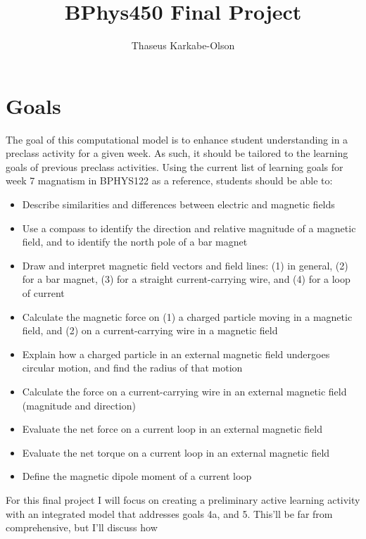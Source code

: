 \documentclass[11pt]{article}
\title{BPhys450 Final Project}
\author{Thaseus Karkabe-Olson}
\date{}
\begin{document}
	\maketitle

    \raggedright

    \section*{Goals}

        The goal of this computational model is to enhance student understanding in a preclass activity for a given week. As such, it should be tailored to the learning goals of previous preclass activities. Using the current list of learning goals for week 7 magnatism in BPHYS122 as a reference, students should be able to:

        \begin{itemize}

            \item Describe similarities and differences between electric and magnetic fields
            \item Use a compass to identify the direction and relative magnitude of a magnetic field, and to identify the north pole of a bar magnet
            \item Draw and interpret magnetic field vectors and field lines: (1) in general, (2) for a bar magnet, (3) for a straight current-carrying wire, and (4) for a loop of current
            \item Calculate the magnetic force on (1) a charged particle moving in a magnetic field, and (2) on a current-carrying wire in a magnetic field
            \item Explain how a charged particle in an external magnetic field undergoes circular motion, and find the radius of that motion
            \item Calculate the force on a current-carrying wire in an external magnetic field (magnitude and direction)
            \item Evaluate the net force on a current loop in an external magnetic field
            \item Evaluate the net torque on a current loop in an external magnetic field
            \item Define the magnetic dipole moment of a current loop

        \end{itemize}

        For this final project I will focus on creating a preliminary active learning activity with an integrated model that addresses goals 4a, and 5. This'll be far from comprehensive, but I'll discuss how 
\end{document}
